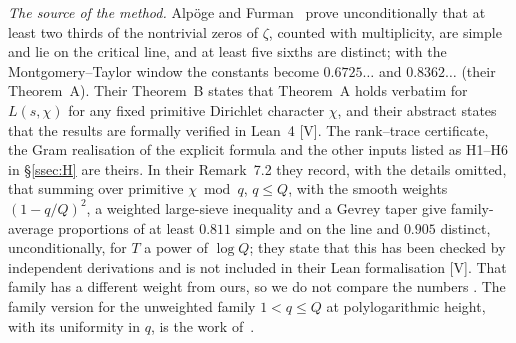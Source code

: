 \emph{The source of the method.} Alp\"oge and Furman~\cite{AF} prove unconditionally that at least two thirds of the nontrivial zeros of $\zeta$,
counted with multiplicity, are simple and lie on the critical line, and at least five sixths are distinct; with the Montgomery--Taylor window the
constants become $0.6725\ldots$ and $0.8362\ldots$ (their Theorem~A). Their Theorem~B states that Theorem~A holds verbatim for $L(s,\chi)$ for any
fixed primitive Dirichlet character $\chi$, and their abstract states that the results are formally verified in Lean~4 [V]. The rank--trace
certificate, the Gram realisation of the explicit formula and the other inputs listed as H1--H6 in \S\ref{ssec:H} are theirs. In their
Remark~7.2 they record, with the details omitted, that summing over primitive $\chi\bmod q$, $q\le Q$, with the smooth weights $(1-q/Q)^2$, a
weighted large-sieve inequality and a Gevrey taper give family-average proportions of at least $0.811$ simple and on the line and $0.905$
distinct, unconditionally, for $T$ a power of $\log Q$; they state that this has been checked by independent derivations and is not included in
their Lean formalisation [V]. That family has a different weight from ours, so we do not compare the numbers \tagM. The family version for the
unweighted family $1<q\le Q$ at polylogarithmic height, with its uniformity in $q$, is the work of~\cite{DSouza}.


